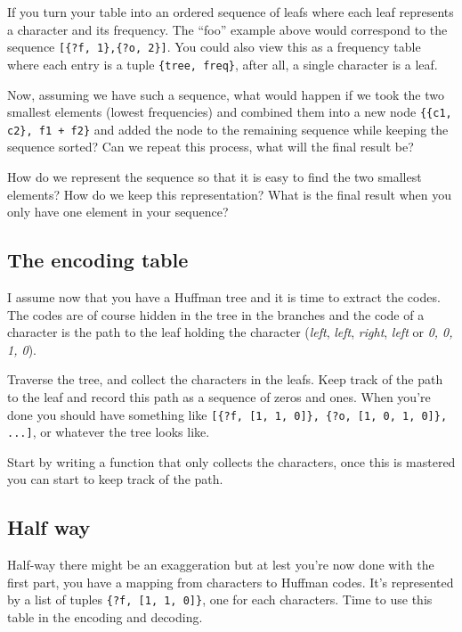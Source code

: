 \documentclass[a4paper,11pt]{article}
\begin{document}
If you turn your table into an ordered sequence of leafs where each
leaf represents a character and its frequency. The ``foo'' example
above would correspond to the sequence {\tt [\{?f, 1\},\{?o, 2\}]}.
You could also view this as a frequency table where each entry is a
tuple {\tt \{tree, freq\}}, after all, a single character is a leaf.

Now, assuming we have such a sequence, what would happen if we took
the two smallest elements (lowest frequencies) and combined them into
a new node {\tt \{\{c1, c2\}, f1 + f2\}} and added the node to the
remaining sequence while keeping the sequence sorted? Can we repeat
this process, what will the final result be?

How do we represent the sequence so that it is easy to find the two
smallest elements? How do we keep this representation? What is the
final result when you only have one element in your sequence?


\subsection{The encoding table}

I assume now that you have a Huffman tree and it is time to extract
the codes. The codes are of course hidden in the tree in the branches
and the code of a character is the path to the leaf holding the
character ({\em left}, {\em left}, {\em right}, {\em left} or {\em
  0, 0, 1, 0}).
  
Traverse the tree, and collect the characters in the leafs. Keep track
of the path to the leaf and record this path as a sequence of zeros
and ones. When you're done you should have something like
{\tt [\{?f, [1, 1, 0]\}, \{?o, [1, 0, 1, 0]\}, ...]}, or whatever the tree
looks like.

Start by writing a function that only collects the characters, once
this is mastered you can start to keep track of the path.


\subsection{Half way}

Half-way there might be an exaggeration but at lest you're now done
with the first part, you have a mapping from characters to Huffman
codes. It's represented by a list of tuples {\tt \{?f, [1, 1, 0]\}},
one for each characters. Time to use this table in the encoding and
decoding.
\end{document}
